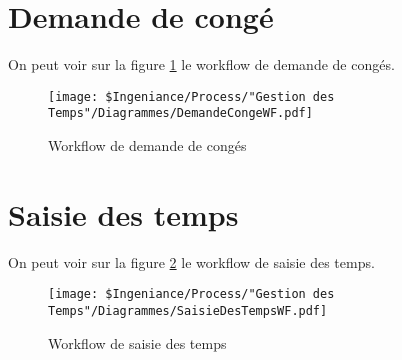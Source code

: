\section{Demande de congé}
On peut voir sur la figure \ref{conges} le workflow de demande de congés. 
\begin{figure}
	\texttt{[image: \$Ingeniance/Process/"Gestion des Temps"/Diagrammes/DemandeCongeWF.pdf]}
	\caption{Workflow de demande de congés}
	\label{conges}
\end{figure}

\section{Saisie des temps}

On peut voir sur la figure \ref{tps} le workflow de saisie des temps. 
\begin{figure}
	\texttt{[image: \$Ingeniance/Process/"Gestion des Temps"/Diagrammes/SaisieDesTempsWF.pdf]}
	\caption{Workflow de saisie des temps}
	\label{tps}
\end{figure}
